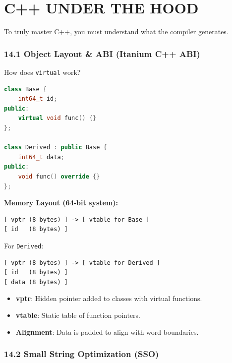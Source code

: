 \hypertarget{c-under-the-hood}{%
\chapter{C++ UNDER THE HOOD}\label{c-under-the-hood}}

To truly master C++, you must understand what the compiler generates.

\hypertarget{object-layout-abi-itanium-c-abi}{%
\subsection{14.1 Object Layout \& ABI (Itanium C++
ABI)}\label{object-layout-abi-itanium-c-abi}}

How does \passthrough{\lstinline!virtual!} work?

\begin{lstlisting}[language={C++}]
class Base {
    int64_t id;
public:
    virtual void func() {}
};

class Derived : public Base {
    int64_t data;
public:
    void func() override {}
};
\end{lstlisting}

\textbf{Memory Layout (64-bit system):}

\begin{lstlisting}
[ vptr (8 bytes) ] -> [ vtable for Base ]
[ id   (8 bytes) ]
\end{lstlisting}

For \passthrough{\lstinline!Derived!}:

\begin{lstlisting}
[ vptr (8 bytes) ] -> [ vtable for Derived ]
[ id   (8 bytes) ]
[ data (8 bytes) ]
\end{lstlisting}

\begin{itemize}
\tightlist
\item
  \textbf{vptr}: Hidden pointer added to classes with virtual functions.
\item
  \textbf{vtable}: Static table of function pointers.
\item
  \textbf{Alignment}: Data is padded to align with word boundaries.
\end{itemize}

\hypertarget{small-string-optimization-sso}{%
\subsection{14.2 Small String Optimization
(SSO)}\label{small-string-optimization-sso}}

